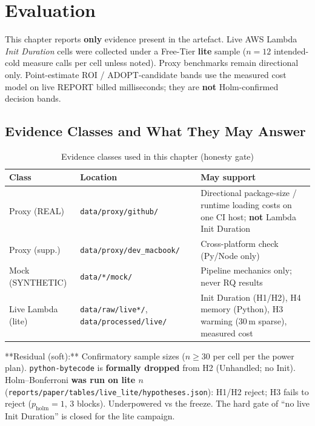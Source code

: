 \chapter{Evaluation}
\label{ch:evaluation}

This chapter reports \textbf{only} evidence present in the artefact. Live AWS Lambda
\textit{Init Duration} cells were collected under a Free-Tier \textbf{lite} sample
($n{=}12$ intended-cold measure calls per cell unless noted). Proxy benchmarks remain
directional only. Point-estimate ROI / ADOPT-candidate bands use the measured cost model
on live REPORT billed milliseconds; they are \textbf{not} Holm-confirmed decision bands.

\section{Evidence Classes and What They May Answer}
\label{sec:eval_provenance}

\begin{table}[h]
\centering
\caption{Evidence classes used in this chapter (honesty gate)}
\label{tab:eval_evidence_classes}
\begin{tabular}{llp{6.5cm}}
\hline
\textbf{Class} & \textbf{Location} & \textbf{May support} \\
\hline
Proxy (REAL) & \texttt{data/proxy/github/} & Directional package-size / runtime
  loading costs on one CI host; \textbf{not} Lambda Init Duration \\
Proxy (supp.) & \texttt{data/proxy/dev\_macbook/} & Cross-platform check (Py/Node only) \\
Mock (SYNTHETIC) & \texttt{data/*/mock/} & Pipeline mechanics only; never RQ results \\
Live Lambda (lite) & \texttt{data/raw/live*/}, \texttt{data/processed/live/} &
  Init Duration (H1/H2), H4 memory (Python), H3 warming (30\,m sparse), measured cost \\
\hline
\end{tabular}
\end{table}

**Residual (soft):** Confirmatory sample sizes ($n{\ge}30$ per cell per the power plan).
\texttt{python-bytecode} is \textbf{formally dropped} from H2 (Unhandled; no Init). Holm--Bonferroni
\textbf{was run on lite $n$} (\texttt{reports/paper/tables/live\_lite/hypotheses.json}): H1/H2 reject;
H3 fails to reject ($p_{\mathrm{holm}}=1$, 3 blocks). Underpowered vs the freeze. The hard gate of
``no live Init Duration'' is closed for the lite campaign.

